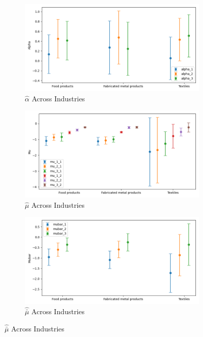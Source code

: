 \documentclass{article}
\begin{document}
\begin{figure}[ht!]
    \centering 
    \caption{I.I.D Mixture Model Across Industries}
    \begin{subfigure}[t]{0.32\textwidth}
        \centering
        \includegraphics[width=\textwidth]{figure/stationary_mixture_alpha_across_industries_m3.png}
        \caption{$\hat\alpha$ Across Industries}
    \end{subfigure}
    \begin{subfigure}[t]{0.32\textwidth}
        \centering
        \includegraphics[width=\textwidth]{figure/stationary_mixture_mu_across_industries_m3.png}
        \caption{$\hat\mu$ Across Industries}
    \end{subfigure}

    \begin{subfigure}[t]{0.32\textwidth}
        \centering
        \includegraphics[width=\textwidth]{figure/stationary_mixture_mubar_across_industries_m3.png}
        \caption{$\hat{\bar\mu}$ Across Industries}


\end{subfigure}
\end{figure}
\end{document}
